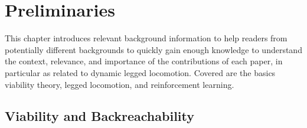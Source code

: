 
\chapter{Preliminaries} \label{chap:prelims}
This chapter introduces relevant background information to help readers from potentially different backgrounds to quickly gain enough knowledge to understand the context, relevance, and importance of the contributions of each paper, in particular as related to dynamic legged locomotion. Covered are the basics viability theory, legged locomotion, and reinforcement learning.

\section{Viability and Backreachability}

